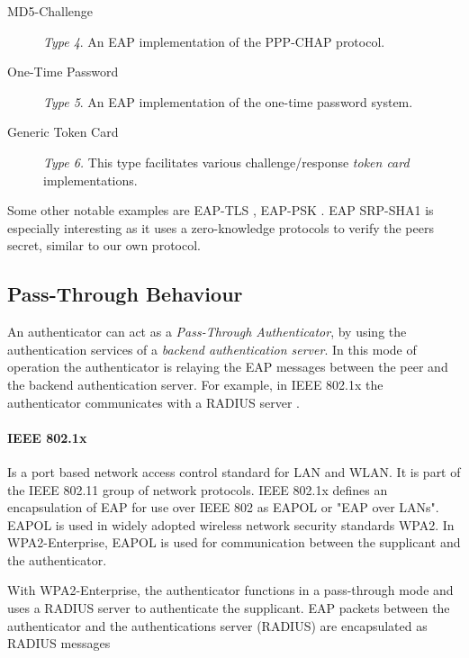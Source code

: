 \begin{description}
	\item[MD5-Challenge] \textit{Type 4}. An EAP implementation of the \cite{simon2008eap} PPP-CHAP protocol.
	\item[One-Time Password] \textit{Type 5}. An EAP implementation of the \cite{haller1998one} one-time password system.
	\item[Generic Token Card] \textit{Type 6.} This type facilitates various challenge/response \textit{token card} implementations.
\end{description}

Some other notable examples are EAP-TLS \cite{simon2008eap}, EAP-PSK \cite{bersani2007eap}.
EAP SRP-SHA1 \cite{carlson135eap} is especially interesting as it uses a zero-knowledge protocols to verify the peers secret, similar to our own protocol.

\subsection{Pass-Through Behaviour}
An authenticator can act as a \textit{Pass-Through Authenticator}, by using the authentication services of a \textit{backend authentication server}.
In this mode of operation the authenticator is relaying the EAP messages between the peer and the backend authentication server.
For example, in IEEE 802.1x the authenticator communicates with a RADIUS server \cite{congdon2003ieee}.

\paragraph{IEEE 802.1x}

Is a port based network access control standard for LAN and WLAN.
It is part of the IEEE 802.11 group of network protocols.
IEEE 802.1x defines an encapsulation of EAP for use over IEEE 802 as EAPOL or "EAP over LANs".
EAPOL is used in widely adopted wireless network security standards WPA2. 
In WPA2-Enterprise, EAPOL is used for communication between the supplicant and the authenticator.

With WPA2-Enterprise, the authenticator functions in a pass-through mode and uses a RADIUS server to authenticate the supplicant.
EAP packets between the authenticator and the authentications server (RADIUS) are encapsulated as RADIUS messages \cite{aboba2003radius, chen2005extensible, congdon2003ieee}